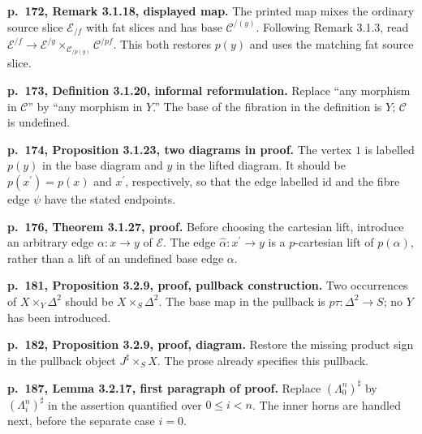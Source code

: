 \par{}
\noindent\textbf{p.~172, Remark 3.1.18, displayed map.}\enspace
The printed map mixes the ordinary source slice $\mathcal E_{/f}$ with fat slices and has base $\mathcal C^{/(y)}$. Following Remark 3.1.3, read $\mathcal E^{/f}\to\mathcal E^{/y}\times_{\mathcal C_{/p(y)}}\mathcal C^{/pf}$. This both restores $p(y)$ and uses the matching fat source slice.

\par{}
\noindent\textbf{p.~173, Definition 3.1.20, informal reformulation.}\enspace
Replace ``any morphism in $\mathcal C$'' by ``any morphism in $Y$.'' The base of the fibration in the definition is $Y$; $\mathcal C$ is undefined.

\par{}
\noindent\textbf{p.~174, Proposition 3.1.23, two diagrams in proof.}\enspace
The vertex $1$ is labelled $p(y)$ in the base diagram and $y$ in the lifted diagram. It should be $p(x^{\prime})=p(x)$ and $x^{\prime}$, respectively, so that the edge labelled $\mathrm{id}$ and the fibre edge $\psi$ have the stated endpoints.

\par{}
\noindent\textbf{p.~176, Theorem 3.1.27, proof.}\enspace
Before choosing the cartesian lift, introduce an arbitrary edge $\alpha\colon x\to y$ of $\mathcal E$. The edge $\hat\alpha\colon x^{\prime}\to y$ is a $p$-cartesian lift of $p(\alpha)$, rather than a lift of an undefined base edge $\alpha$.

\par{}
\noindent\textbf{p.~181, Proposition 3.2.9, proof, pullback construction.}\enspace
Two occurrences of $X\times_Y\Delta^2$ should be $X\times_S\Delta^2$. The base map in the pullback is $p\tau\colon\Delta^2\to S$; no $Y$ has been introduced.

\par{}
\noindent\textbf{p.~182, Proposition 3.2.9, proof, diagram.}\enspace
Restore the missing product sign in the pullback object $J^{\sharp}\times_S X$. The prose already specifies this pullback.

\par{}
\noindent\textbf{p.~187, Lemma 3.2.17, first paragraph of proof.}\enspace
Replace $(\Lambda^n_0)^{\sharp}$ by $(\Lambda^n_i)^{\sharp}$ in the assertion quantified over $0\le i<n$. The inner horns are handled next, before the separate case $i=0$.

